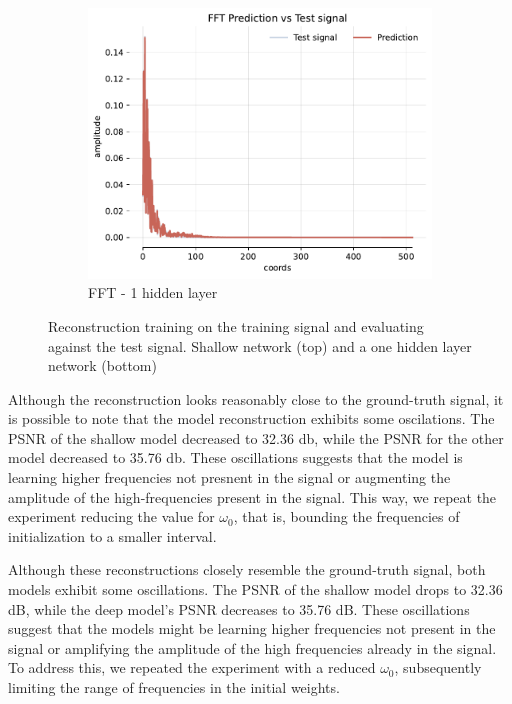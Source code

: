 \begin{figure}[!h]
\begin{subfigure}[b]{0.32\textwidth}
        \centering
        \includegraphics[width=\textwidth]{img/ch3/fft-64hf-1hl-32w-sub3.pdf}
        \caption{FFT - 1 hidden layer}
    \end{subfigure}
    \caption{Reconstruction training on the training signal and evaluating against the test signal. Shallow network (top) and a one hidden layer network (bottom)}
    \label{f:pred-256samples-shallow-deep}
\end{figure}

Although the reconstruction looks reasonably close to the ground-truth signal, it is possible to note that the model reconstruction exhibits some oscilations. The PSNR of the shallow model decreased to 32.36 db, while the PSNR for the other model decreased to 35.76 db. These oscillations suggests that the model is learning higher frequencies not presnent in the signal or augmenting the amplitude of the high-frequencies present in the signal. This way, we repeat the experiment reducing the value for $\omega_0$, that is, bounding the frequencies of initialization to a smaller interval.


Although these reconstructions closely resemble the ground-truth signal, both models exhibit some oscillations. The PSNR of the shallow model drops to 32.36 dB, while the deep model’s PSNR decreases to 35.76 dB. These oscillations suggest that the models might be learning higher frequencies not present in the signal or amplifying the amplitude of the high frequencies already in the signal. To address this, we repeated the experiment with a reduced \(\omega_0\), subsequently limiting the range of frequencies in the initial weights.

